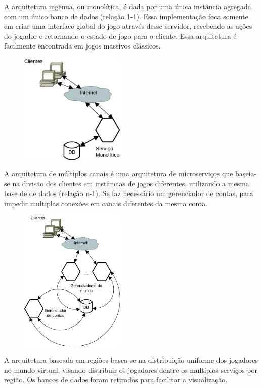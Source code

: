 A arquitetura ingênua, ou monolítica, é dada por uma única instância agregada com um único banco de dados (relação 1-1). Essa implementação foca somente em criar uma interface global do jogo através desse servidor, recebendo as ações do jogador e retornando o estado de jogo para o cliente. Essa arquitetura é facilmente encontrada em jogos massivos clássicos.

\begin{figure}[H]
  \includegraphics[width=5cm]{arquiteturas/monolitica.png}
  \centering
\end{figure}

A arquitetura de múltiplos canais\cite{1417630} é uma arquitetura de microserviços que baseia-se na divisão dos clientes em instâncias de jogos diferentes, utilizando a mesma base de de dados (relação n-1). Se faz necessário um gerenciador de contas, para impedir multiplas conexões em canais diferentes da mesma conta.

\begin{figure}[H]
  \includegraphics[width=5cm]{arquiteturas/multiplos_canais.png}
  \centering
\end{figure}

A arquitetura baseada em regiões\cite{albion_online_unite} basea-se na distribuição uniforme dos jogadores no mundo virtual, visando distribuir os jogadores dentre os multiplos serviços por região. Os bancos de dados foram retirados para facilitar a visualização.

